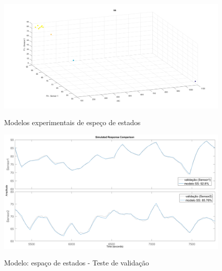 \begin{apendicesenv}
\begin{figure}[h]
	\caption{Modelos experimentais de espeço de estados}
	\begin{center}
		\includegraphics[width=1.00\textwidth]{./5_images/tclabsp-models-SS.png} 
		\label{fig:tclabsp-models-ss}
	\end{center}
	\centering
\end{figure}

\begin{figure}
	\caption{Modelo: espaço de estados - Teste de validação}
	\begin{center}
		\includegraphics[width=1.00\textwidth]{./5_images/tclabsp-models-SS-compare.png} 
		\label{fig:tclabsp-models-ss-compare}
	\end{center}
	\centering
\end{figure}


\end{apendicesenv}
